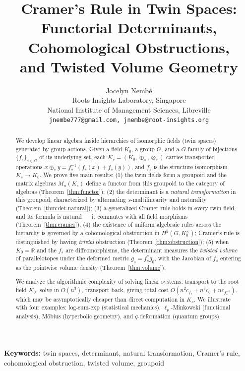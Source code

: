 \documentclass[11pt,twocolumn]{article}
\title{\textbf{Cramer's Rule in Twin Spaces:\\Functorial Determinants, Cohomological Obstructions,\\and Twisted Volume Geometry}}
\author{Jocelyn Nemb\'e\\
\small Roots Insights Laboratory, Singapore\\
\small National Institute of Management Sciences, Libreville\\
\small \texttt{jnembe777@gmail.com, jnembe@root-insights.org}}
\date{}
\theoremstyle{plain}
\theoremstyle{definition}
\theoremstyle{remark}
\begin{document}
\maketitle

\begin{abstract}
We develop linear algebra inside hierarchies of isomorphic fields (twin spaces) generated by group actions. Given a field $K_0$, a group $G$, and a $G$-family of bijections $\{f_s\}_{s \in G}$ of its underlying set, each $K_s = (K_0, \oplus_s, \otimes_s)$ carries transported operations $x \oplus_s y = f_s^{-1}(f_s(x) + f_s(y))$, and $f_s$ is the structure isomorphism $K_s \to K_0$. We prove five main results:
(1) the twin fields form a groupoid and the matrix algebras $M_n(K_s)$ define a functor from this groupoid to the category of algebras (Theorem~\ref{thm:functor});
(2) the determinant is a \emph{natural transformation} in this groupoid, characterized by alternating $s$-multilinearity and naturality (Theorem~\ref{thm:det-natural});
(3) a generalized Cramer rule holds in every twin field, and its formula is natural --- it commutes with all field morphisms (Theorem~\ref{thm:cramer});
(4) the existence of uniform algebraic rules across the hierarchy is governed by a cohomological obstruction in $H^2(G, K_0^\times)$; Cramer's rule is distinguished by having \emph{trivial} obstruction (Theorem~\ref{thm:obstruction});
(5) when $K_0 = \mathbb{R}$ and the $f_s$ are diffeomorphisms, the determinant measures the \emph{twisted volume} of parallelotopes under the deformed metric $g_s = f_s^*g_0$, with the Jacobian of $f_s$ entering as the pointwise volume density (Theorem~\ref{thm:volume}).

We analyze the algorithmic complexity of solving linear systems: transport to the root field $K_0$, solve in $O(n^3)$, transport back, giving total cost $O(n^2 c_{f_s} + n^3 c_0 + n c_{f_s^{-1}})$, which may be asymptotically cheaper than direct computation in $K_s$. We illustrate with four examples: log-sum-exp (statistical mechanics), $\ell_p$-Minkowski (functional analysis), M\"obius (hyperbolic geometry), and $q$-deformation (quantum groups).
\end{abstract}

\noindent\textbf{Keywords:} twin spaces, determinant, natural transformation, Cramer's rule, cohomological obstruction, twisted volume, groupoid


\end{document}
